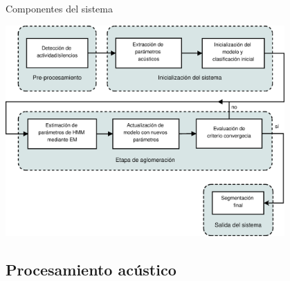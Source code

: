 \begin{frame}{Componentes del sistema}
  \begin{center}
    \includegraphics[width=0.8\textwidth]{gfx/ASR_flow}
  \end{center}
\end{frame}

\subsection{Procesamiento acústico}

